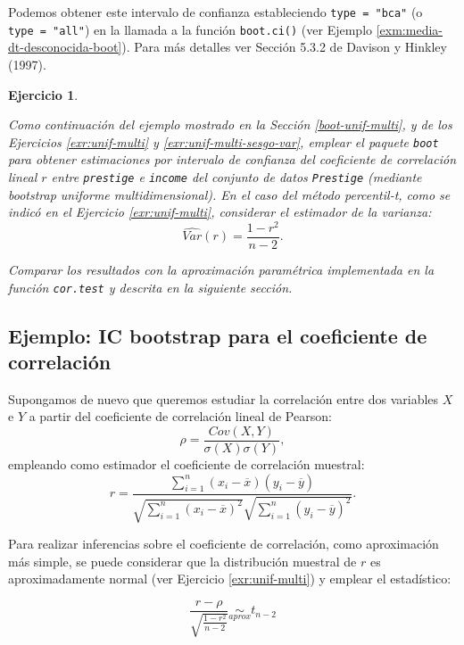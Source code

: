 \documentclass[
]{book}
\theoremstyle{break}
\newtheorem{exercise}{Ejercicio}[chapter]
\theoremstyle{nonumberplain}
\begin{document}
Podemos obtener este intervalo de confianza estableciendo \texttt{type\ =\ "bca"} (o \texttt{type\ =\ "all"}) en la llamada a la función \texttt{boot.ci()} (ver Ejemplo \ref{exm:media-dt-desconocida-boot}).
Para más detalles ver Sección 5.3.2 de Davison y Hinkley (1997).

\begin{exercise}
\protect\hypertarget{exr:boot-unif-multi-ic}{}\label{exr:boot-unif-multi-ic}

Como continuación del ejemplo mostrado en la Sección \ref{boot-unif-multi}, y de los Ejercicios \ref{exr:unif-multi} y \ref{exr:unif-multi-sesgo-var}, emplear el paquete \texttt{boot} para obtener estimaciones por intervalo de confianza del coeficiente de correlación lineal \(r\) entre \texttt{prestige} e \texttt{income} del conjunto de datos \texttt{Prestige} (mediante bootstrap uniforme multidimensional).
En el caso del método percentil-\emph{t}, como se indicó en el Ejercicio \ref{exr:unif-multi}, considerar el estimador de la varianza:
\[\widehat{Var}(r) = \frac{1 - r^2}{n - 2}.\]

Comparar los resultados con la aproximación paramétrica implementada en la función \texttt{cor.test} y descrita en la siguiente sección.
\end{exercise}

\hypertarget{icboot-trans}{%
\subsection{Ejemplo: IC bootstrap para el coeficiente de correlación}\label{icboot-trans}}

Supongamos de nuevo que queremos estudiar la correlación entre dos variables \(X\) e \(Y\) a partir del coeficiente de correlación lineal de Pearson:
\[\rho =\frac{ Cov \left( X, Y \right) }
{ \sigma \left( X \right) \sigma \left( Y \right) },\]
empleando como estimador el coeficiente de correlación muestral:
\[r=\frac{\sum_{i=1}^{n}(x_i-\overline{x})(y_i-\overline{y})}
{\sqrt{ \sum_{i=1}^{n}(x_i-\overline{x})^{2}} 
\sqrt{\sum_{i=1}^{n}(y_i-\overline{y})^{2}}}.\]

Para realizar inferencias sobre el coeficiente de correlación, como aproximación más simple, se puede considerar que la distribución muestral de \(r\) es aproximadamente normal (ver Ejercicio \ref{exr:unif-multi}) y emplear el estadístico:

\begin{equation} 
\frac{r -\rho}{\sqrt{\frac{1 - r^2}{n - 2}}} \underset{aprox}{\sim } t_{n-2}
\label{eq:cor-t}
\end{equation}
\end{document}
